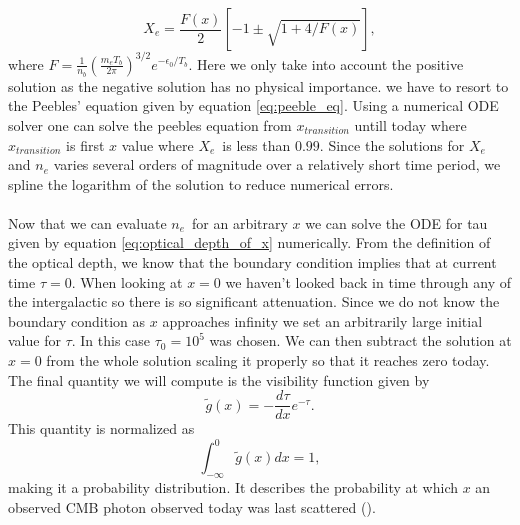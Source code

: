\documentclass[onecolumn]{aastex62}
\begin{document}
\begin{equation}
    X_e = \frac{F(x)}{2}\left[-1\pm\sqrt{1+4/F(x)}\right],
\end{equation}
where $F=\frac{1}{n_b} \left(\frac{m_eT_b}{2\pi}\right)^{3/2} e^{-\epsilon_0/T_b}$. Here we only take into account the positive solution as the negative solution has no physical importance. we have to resort to the Peebles' equation given by equation \ref{eq:peeble_eq}. Using a numerical ODE solver one can solve the peebles equation from $x_{transition}$ untill today where $x_{transition}$ is first $x$ value where $X_e$ is less than $0.99$. Since the solutions for $X_e$ and $n_e$ varies several orders of magnitude over a relatively short time period, we spline the logarithm of the solution to reduce numerical errors.
\\\\\indent
Now that we can evaluate $n_e$ for an arbitrary $x$ we can solve the ODE for tau given by equation \ref{eq:optical_depth_of_x} numerically. From the definition of the optical depth, we know that the boundary condition implies that at current time $\tau=0$. When looking at $x=0$ we haven't looked back in time through any of the intergalactic so there is so significant attenuation. Since we do not know the boundary condition as $x$ approaches infinity we set an arbitrarily large initial value for $\tau$. In this case $\tau_0=10^5$ was chosen. We can then subtract the solution at $x=0$ from the whole solution scaling it properly so that it reaches zero today. The final quantity we will compute is the visibility function given by
\begin{equation}\label{eq:visibility}
    \widetilde{g}(x)=-\frac{d\tau}{dx}e^{-\tau}.
\end{equation}
This quantity is normalized as
\begin{equation}
    \int_{-\infty}^{0} \tilde{g}(x)dx = 1,
\end{equation}
making it a probability distribution. It describes the probability at which $x$ an observed CMB photon observed today was last scattered (\cite{callin2006calculate}).
\end{document}
